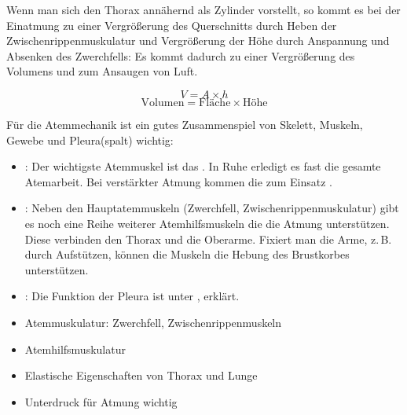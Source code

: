 {%
\label{topic:atemmechanik}%
%
%
Wenn man sich den Thorax annähernd als Zylinder vorstellt,
so kommt es bei der Einatmung zu einer Vergrößerung des Querschnitts durch Heben der
Zwischenrippenmuskulatur und 
Vergrößerung der Höhe durch Anspannung und Absenken des Zwerchfells: Es kommt dadurch zu einer Vergrößerung des Volumens und zum Ansaugen von Luft.

\begin{equation}
V = A \times h
\end{equation}
\begin{equation}
\mbox{Volumen} = \mbox{Fläche} \times \mbox{Höhe}
\end{equation}

Für die Atemmechanik ist ein gutes Zusammenspiel von
Skelett, Muskeln, Gewebe und Pleura(spalt) wichtig:

\begin{itemize}
  \item {}: Der wichtigste Atemmuskel ist
  das . In Ruhe erledigt es
  fast die gesamte Atemarbeit. Bei verstärkter Atmung kommen die
   zum Einsatz \cite{LippertAnatomie7}.
  
  \item {}: %
  \label{topic:atemhilfsmuskulatur}%
  Neben den Hauptatemmuskeln (Zwerchfell,
  Zwischenrippenmuskulatur) gibt es noch eine Reihe weiterer
  Atemhilfsmuskeln die die Atmung unterstützen. Diese
  verbinden den Thorax und die Oberarme. Fixiert man die Arme,
  z.\,B. durch Aufstützen, können die Muskeln die Hebung des
  Brustkorbes unterstützen.
    
  \item {}: Die Funktion der Pleura ist unter 
  ,
  erklärt. 
\end{itemize}










}
{
\begin{itemize}
  \item Atemmuskulatur: Zwerchfell, Zwischenrippenmuskeln
  \item Atemhilfsmuskulatur
  \item Elastische Eigenschaften von Thorax und Lunge
  \item Unterdruck für Atmung wichtig
\end{itemize}
}{}{}{}

